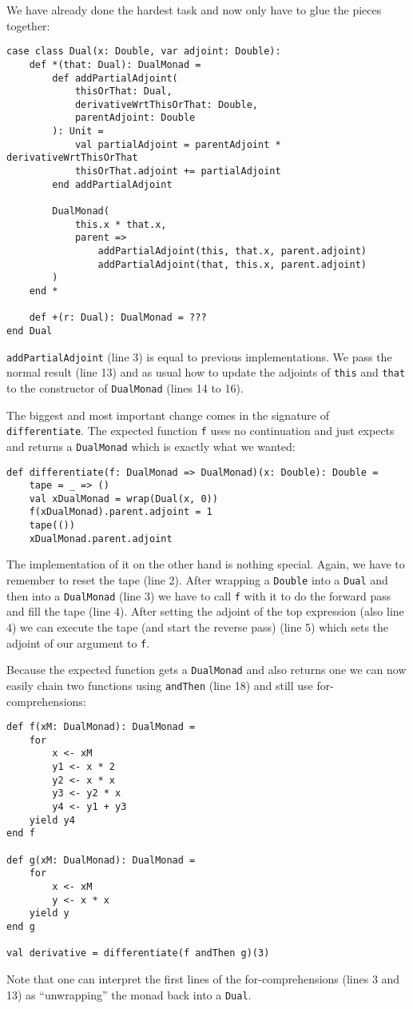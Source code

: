 We have already done the hardest task and now only have to glue the pieces together:
\begin{lstlisting}
case class Dual(x: Double, var adjoint: Double):
    def *(that: Dual): DualMonad =
        def addPartialAdjoint(
            thisOrThat: Dual,
            derivativeWrtThisOrThat: Double,
            parentAdjoint: Double
        ): Unit =
            val partialAdjoint = parentAdjoint * derivativeWrtThisOrThat
            thisOrThat.adjoint += partialAdjoint
        end addPartialAdjoint

        DualMonad(
            this.x * that.x,
            parent =>
                addPartialAdjoint(this, that.x, parent.adjoint)
                addPartialAdjoint(that, this.x, parent.adjoint)
        )
    end *

    def +(r: Dual): DualMonad = ???
end Dual
\end{lstlisting}
\lstinline{addPartialAdjoint} (line 3) is equal to previous implementations. We pass the normal result (line 13) and as usual how to update the adjoints of \lstinline{this} and \lstinline{that} to the constructor of \lstinline{DualMonad} (lines 14 to 16).

The biggest and most important change comes in the signature of \lstinline{differentiate}. The expected function \lstinline{f} uses no continuation and just expects and returns a \lstinline{DualMonad} which is exactly what we wanted:
\begin{lstlisting}
def differentiate(f: DualMonad => DualMonad)(x: Double): Double =
    tape = _ => ()
    val xDualMonad = wrap(Dual(x, 0))
    f(xDualMonad).parent.adjoint = 1
    tape(())
    xDualMonad.parent.adjoint
\end{lstlisting}
The implementation of it on the other hand is nothing special. Again, we have to remember to reset the tape (line 2). After wrapping a \lstinline{Double} into a \lstinline{Dual} and then into a \lstinline{DualMonad} (line 3) we have to call \lstinline{f} with it to do the forward pass and fill the tape (line 4). After setting the adjoint of the top expression (also line 4) we can execute the tape (and start the reverse pass) (line 5) which sets the adjoint of our argument to \lstinline{f}.

Because the expected function gets a \lstinline{DualMonad} and also returns one we can now easily chain two functions using \lstinline{andThen} (line 18) and still use for-comprehensions:
\begin{lstlisting}
def f(xM: DualMonad): DualMonad =
    for
        x <- xM
        y1 <- x * 2
        y2 <- x * x
        y3 <- y2 * x
        y4 <- y1 + y3
    yield y4
end f

def g(xM: DualMonad): DualMonad =
    for
        x <- xM
        y <- x * x
    yield y
end g

val derivative = differentiate(f andThen g)(3)
\end{lstlisting}
Note that one can interpret the first lines of the for-comprehensions (lines 3 and 13) as ``unwrapping'' the monad back into a \lstinline{Dual}.